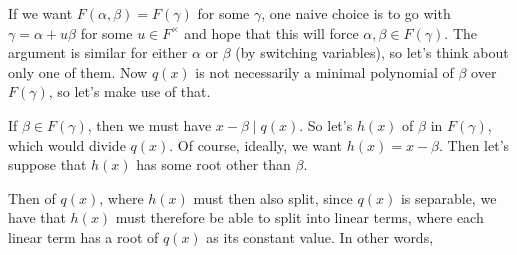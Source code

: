 \documentclass[notoc,notitlepage]{tufte-book}
\begin{document}
\begin{strategy}\label{strategy:analysis_of_proof_of_primitive_element_theorem}
  If we want $F(\alpha, \beta) = F(\gamma)$ for some $\gamma$, one naive
  choice is to go with $\gamma = \alpha + u \beta$ for some $u \in F^\times$
  and hope that this will force $\alpha, \beta \in F(\gamma)$. The argument is
  similar for either $\alpha$ or $\beta$ (by switching variables), so let's
  think about only one of them. Now $q(x)$ is not necessarily a minimal
  polynomial of $\beta$ over $F(\gamma)$, so let's make use of that.

  If $\beta \in F(\gamma)$, then we must have $x - \beta \mid q(x)$. So let's
   $h(x)$ of $\beta$ in $F(\gamma)$,
  which would divide $q(x)$. Of course, ideally, we want $h(x) = x - \beta$.
  Then let's suppose that $h(x)$ has some root other than $\beta$.

  Then  of $q(x)$, where $h(x)$ must then also
  split, since $q(x)$ is separable, we have that $h(x)$ must therefore be able
  to split into linear terms, where each linear term has a root of $q(x)$ as its
  constant value. In other words,  


\end{strategy}
\end{document}
